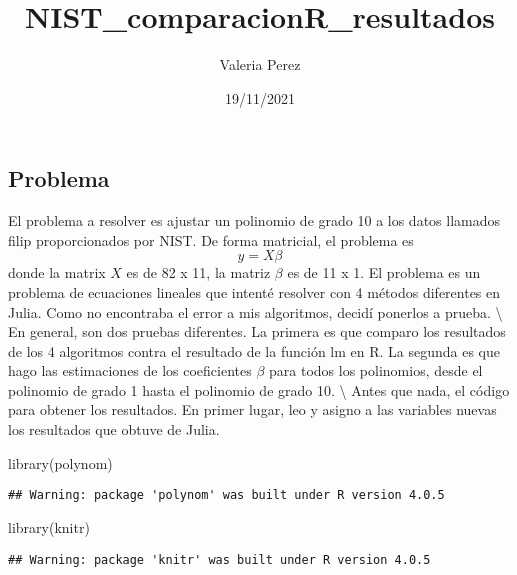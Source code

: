 \documentclass[
]{article}
\title{NIST\_comparacionR\_resultados}
\author{Valeria Perez}
\date{19/11/2021}
\newenvironment{Shaded}{\begin{snugshade}}{\end{snugshade}}
\newcommand{\FunctionTok}[1]{\textcolor[rgb]{0.00,0.00,0.00}{#1}}
\newcommand{\NormalTok}[1]{#1}
\begin{document}
\maketitle

\hypertarget{problema}{%
\subsection{Problema}\label{problema}}

El problema a resolver es ajustar un polinomio de grado 10 a los datos
llamados filip proporcionados por NIST. De forma matricial, el problema
es \[y = X \beta\] donde la matrix \(X\) es de 82 x 11, la matriz
\(\beta\) es de 11 x 1. El problema es un problema de ecuaciones
lineales que intenté resolver con 4 métodos diferentes en Julia. Como no
encontraba el error a mis algoritmos, decidí ponerlos a prueba.
\textbackslash{} En general, son dos pruebas diferentes. La primera es
que comparo los resultados de los 4 algoritmos contra el resultado de la
función lm en R. La segunda es que hago las estimaciones de los
coeficientes \(\beta\) para todos los polinomios, desde el polinomio de
grado 1 hasta el polinomio de grado 10. \textbackslash{} Antes que nada,
el código para obtener los resultados. En primer lugar, leo y asigno a
las variables nuevas los resultados que obtuve de Julia.

\begin{Shaded}
\begin{Highlighting}[]
\FunctionTok{library}\NormalTok{(polynom)}
\end{Highlighting}
\end{Shaded}

\begin{verbatim}
## Warning: package 'polynom' was built under R version 4.0.5
\end{verbatim}

\begin{Shaded}
\begin{Highlighting}[]
\FunctionTok{library}\NormalTok{(knitr)}
\end{Highlighting}
\end{Shaded}

\begin{verbatim}
## Warning: package 'knitr' was built under R version 4.0.5
\end{verbatim}
\end{document}
